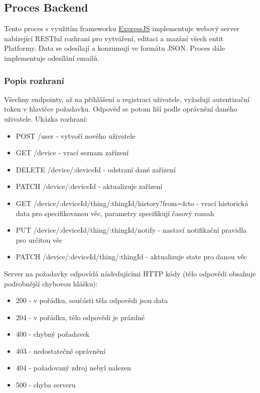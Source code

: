 \subsection{Proces Backend}
Tento proces s využitím frameworku \hyperref[expressjs]{ExpressJS} implementuje webový server nabízející RESTful rozhraní pro vytváření, editaci a mazání všech entit Platformy. Data se odesílají a konzumují ve formátu JSON. Proces dále implementuje odesílání emailů.

\subsubsection{Popis rozhraní}
Všechny endpointy, až na přihlášení a registraci uživatele, vyžadují autentizační token v hlavičce požadavku. Odpověď se potom liší podle oprávnění daného uživatele. Ukázka rozhraní:
\begin{itemize}
    \item POST /user - vytvoří nového uživatele
    \item GET /device - vrací seznam zařízení
    \item DELETE /device/:deviceId - odstraní dané zařízení
    \item PATCH /device/:deviceId - aktualizuje zařízení
    \item GET /device/:deviceId/thing/:thingId/history?from=\&to - vrací historická data pro specifikovanou věc, parametry specifikují časový rozsah
    \item PUT /device/:deviceId/thing/:thingId/notify - nastaví notifikační pravidla pro určitou věc
    \item PATCH /device/:deviceId/thing/:thingId - aktualizuje state pro danou věc
\end{itemize}

Server na požadavky odpovídá následujícími HTTP kódy (tělo odpovědi obsahuje podrobnější chybovou hlášku):
\begin{itemize}
    \item 200 - v pořádku, součásti těla odpovědi jsou data
    \item 204 - v pořádku, tělo odpovědi je prázdné
    \item 400 - chybný požadavek
    \item 403 - nedostatečné oprávnění
    \item 404 - požadovaný zdroj nebyl nalezen
    \item 500 - chyba serveru
\end{itemize}


